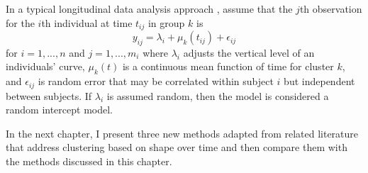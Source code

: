 In a typical longitudinal data analysis approach \cite{diggle2002}, assume that the $j$th observation for the $i$th individual at time $t_{ij}$ in group $k$ is
$$y_{ij}=\lambda_{i}+\mu_k(t_{ij})+\epsilon_{ij}$$
for $i=1,...,n$ and $j=1,...,m_{i}$ where $\lambda_{i}$ adjusts the vertical level of an individuals' curve, $\mu_k(t)$ is a continuous mean function of time for cluster $k$, and $\epsilon_{ij}$ is random error that may be correlated within subject $i$ but independent between subjects. If $\lambda_{i}$ is assumed random, then the model is considered a random intercept model. 

 In the next chapter, I present three new methods adapted from related literature that address clustering based on shape over time and then compare them with the methods discussed in this chapter.	
